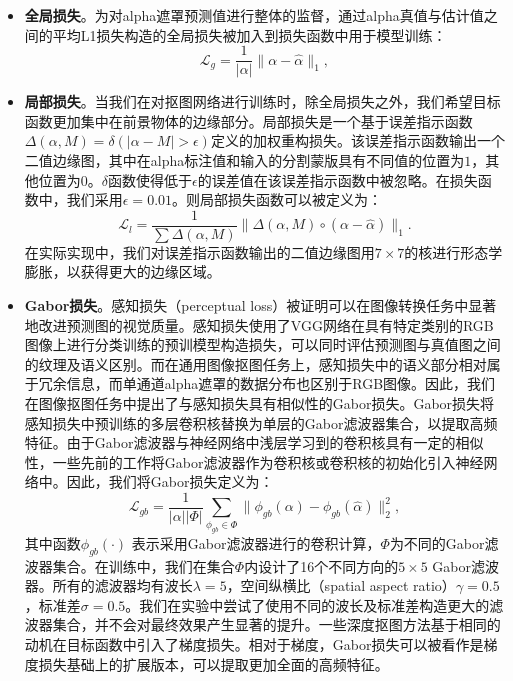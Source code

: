 \begin{itemize}
	\item \textbf{全局损失}。为对alpha遮罩预测值进行整体的监督，通过alpha真值与估计值之间的平均L1损失构造的全局损失被加入到损失函数中用于模型训练：
	\begin{equation}
	\mathcal{L}_g = \frac{1}{|\alpha|}\|\alpha-\hat{\alpha}\|_1, 
	\end{equation}

	\item \textbf{局部损失}。当我们在对抠图网络进行训练时，除全局损失之外，我们希望目标函数更加集中在前景物体的边缘部分。局部损失是一个基于误差指示函数$ \Delta(\alpha, M) = \delta(|\alpha - M|>\epsilon) $定义的加权重构损失。该误差指示函数输出一个二值边缘图，其中在alpha标注值和输入的分割蒙版具有不同值的位置为$1$，其他位置为$0$。$ \delta $函数使得低于$ \epsilon $的误差值在该误差指示函数中被忽略。在损失函数中，我们采用$ \epsilon=0.01 $。则局部损失函数可以被定义为： 
	\begin{equation}
	\mathcal{L}_l = \frac{1}{\sum \Delta(\alpha, M)}\|\Delta(\alpha, M) \circ (\alpha-\hat{\alpha})\|_1.
	\end{equation}
	在实际实现中，我们对误差指示函数输出的二值边缘图用$ 7\times 7 $的核进行形态学膨胀，以获得更大的边缘区域。

	\item \textbf{Gabor损失}。感知损失（perceptual loss）\cite{johnson2016perceptual}被证明可以在图像转换任务中显著地改进预测图的视觉质量。感知损失使用了VGG网络\cite{simonyan2014very}在具有特定类别的RGB图像上进行分类训练的预训模型构造损失，可以同时评估预测图与真值图之间的纹理及语义区别。而在通用图像抠图任务上，感知损失中的语义部分相对属于冗余信息，而单通道alpha遮罩的数据分布也区别于RGB图像。因此，我们在图像抠图任务中提出了与感知损失具有相似性的Gabor损失。Gabor损失将感知损失中预训练的多层卷积核替换为单层的Gabor滤波器集合，以提取高频特征。由于Gabor滤波器与神经网络中浅层学习到的卷积核具有一定的相似性，一些先前的工作\cite{ouyang2013joint}将Gabor滤波器作为卷积核或卷积核的初始化引入神经网络中。因此，我们将Gabor损失定义为：
	\begin{equation}
	\mathcal{L}_{gb} = \frac{1}{|\alpha||\Phi|}\sum_{\phi_{gb}\in \Phi}\|\phi_{gb}(\alpha)-\phi_{gb}(\hat{\alpha})\|_2^2,
	\end{equation}
	其中函数$ \phi_{gb}(\cdot)$ 表示采用Gabor滤波器进行的卷积计算，$ \Phi $为不同的Gabor滤波器集合。在训练中，我们在集合$ \Phi $内设计了16个不同方向的$5\times5$ Gabor滤波器。所有的滤波器均有波长$\lambda=5$，空间纵横比（spatial aspect ratio）$\gamma=0.5$，标准差$\sigma=0.5$。我们在实验中尝试了使用不同的波长及标准差构造更大的滤波器集合，并不会对最终效果产生显著的提升。一些深度抠图方法基于相同的动机在目标函数中引入了梯度损失\cite{levinshtein2018real,chen2019boundary,samplenet}。相对于梯度，Gabor损失可以被看作是梯度损失基础上的扩展版本，可以提取更加全面的高频特征。
\end{itemize}


